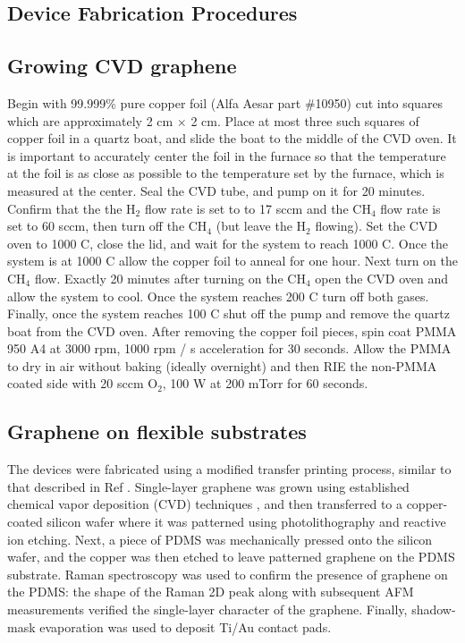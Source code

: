 \documentclass[edeposit,fullpage,draftthesis]{uiucthesis2009}
\begin{document}
 
\begin{appendices}

\chapter{Device Fabrication Procedures}
\label{appendix:fab}

\section{Growing CVD graphene}

    Begin with 99.999\% pure copper foil (Alfa Aesar part \#10950) cut into squares which are
    approximately 2 cm $\times$ 2 cm. Place at most three such squares of copper foil
    in a quartz boat, and slide the boat to the middle of the CVD oven. It is important
    to accurately center the foil in the furnace so that the temperature at the foil is as
    close as possible to the temperature set by the furnace, which is measured at the center.
    Seal the CVD tube, and pump on it for 20 minutes. Confirm that the the H$_2$ flow rate 
    is set to to 17 sccm and the CH$_4$ flow rate is set to 60 sccm, then turn off the CH$_4$
    (but leave the H$_2$ flowing). Set the CVD oven to 1000 C, close the lid, and wait for the
    system to reach 1000 C. Once the system is at 1000 C allow the copper foil to anneal for
    one hour. Next turn on the CH$_4$ flow. Exactly 20 minutes after turning on the CH$_4$
    open the CVD oven and allow the system to cool. Once the system reaches 200 C turn off
    both gases. Finally, once the system reaches 100 C shut off the pump and remove the 
    quartz boat from the CVD oven. After removing the copper foil pieces, spin coat PMMA 950 A4
    at 3000 rpm, 1000 rpm / s acceleration for 30 seconds. Allow the PMMA to dry in air without
    baking (ideally overnight) and then RIE the non-PMMA coated side with 20 sccm O$_2$, 100 W 
    at 200 mTorr for 60 seconds.
    
\section{Graphene on flexible substrates}
   
        The devices were fabricated using a modified transfer
        printing process, similar to that described in Ref \cite{Kim2009}.
        Single-layer graphene was grown using established chemical vapor deposition
        (CVD) techniques \cite{Li2009}, and then transferred to a copper-coated silicon
        wafer where it was patterned using photolithography and reactive ion etching.
        Next, a piece of PDMS was mechanically pressed onto the silicon wafer, and the
        copper was then etched to leave patterned graphene on the PDMS
        substrate\cite{Lee2010}. Raman spectroscopy was used to confirm the presence of
        graphene on the PDMS: the shape of the Raman 2D
        peak\cite{Ferrari2006} along with subsequent AFM measurements verified the
        single-layer character of the graphene. Finally, shadow-mask evaporation was
        used to deposit Ti/Au contact pads.


\end{appendices}
\end{document}
